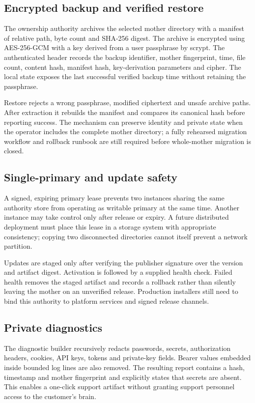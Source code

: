 \subsection{Encrypted backup and verified restore}

The ownership authority archives the selected mother directory with a manifest of
relative path, byte count and SHA-256 digest.  The archive is encrypted using
AES-256-GCM with a key derived from a user passphrase by scrypt.  The authenticated
header records the backup identifier, mother fingerprint, time, file count, content
hash, manifest hash, key-derivation parameters and cipher.  The local state exposes
the last successful verified backup time without retaining the passphrase.

Restore rejects a wrong passphrase, modified ciphertext and unsafe archive paths.
After extraction it rebuilds the manifest and compares its canonical hash before
reporting success.  The mechanism can preserve identity and private state when the
operator includes the complete mother directory; a fully rehearsed migration
workflow and rollback runbook are still required before whole-mother migration is
closed.

\subsection{Single-primary and update safety}

A signed, expiring primary lease prevents two instances sharing the same authority
store from operating as writable primary at the same time.  Another instance may
take control only after release or expiry.  A future distributed deployment must
place this lease in a storage system with appropriate consistency; copying two
disconnected directories cannot itself prevent a network partition.

Updates are staged only after verifying the publisher signature over the version and
artifact digest.  Activation is followed by a supplied health check.  Failed health
removes the staged artifact and records a rollback rather than silently leaving the
mother on an unverified release.  Production installers still need to bind this
authority to platform services and signed release channels.

\subsection{Private diagnostics}

The diagnostic builder recursively redacts passwords, secrets, authorization
headers, cookies, API keys, tokens and private-key fields.  Bearer values embedded
inside bounded log lines are also removed.  The resulting report contains a hash,
timestamp and mother fingerprint and explicitly states that secrets are absent.
This enables a one-click support artifact without granting support personnel access
to the customer's brain.

